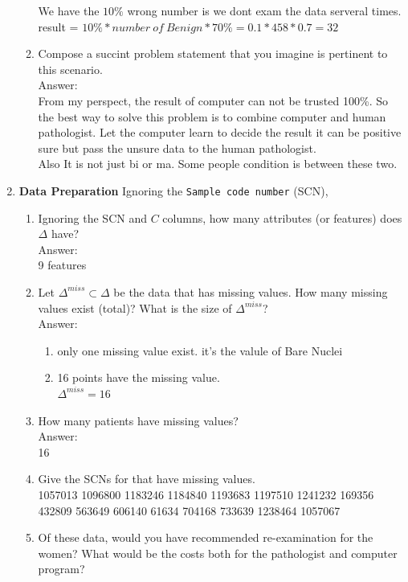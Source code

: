 \documentclass{article}
\begin{document}
\begin{enumerate}
\begin{enumerate}
 	 We have the $10\%$ wrong number is we dont exam the data serveral times.\\
 	 result = $10\% * number\ of\ Benign * 70\% = 0.1*458*0.7 =  32$
 	 \item Compose a succint problem statement that you imagine is pertinent to this scenario. \\
 	 Answer:\\
 	 From my perspect, the result of computer can not be trusted 100\%. So the best way to solve this problem is to combine computer and human pathologist. Let the computer learn to decide the result it can be positive sure but pass the unsure data to the human pathologist.\\
 	 Also It is not just bi or ma. Some people condition is between these two.
 	 \end{enumerate} \item {\bf Data Preparation} Ignoring the \texttt{Sample code number} (SCN), \begin{enumerate} \item Ignoring the SCN and $C$ columns, how many attributes (or features) does $\Delta$ have? \\
 	 Answer:\\
 	 9 features
 	 \item Let $\Delta^{miss}\subset \Delta$ be the data that has missing values.  How many missing values exist (total)?  What is the size of $\Delta^{miss}$? \\
 	 Answer:\\
 	 \begin{enumerate}
 	 	\item only one missing value exist. it's the valule of Bare Nuclei
 	 	\item 16 points have the missing value. \\
 	 	$\Delta^{miss} = 16$
 	 \end{enumerate}
 	 \item How many patients have missing values?\\
 	 Answer:\\
 	 16
 	  \item Give the SCNs for that have missing values.  \\
 	  1057013 1096800 1183246 1184840 1193683 1197510 1241232  169356  432809  563649  606140   61634  704168  733639 1238464 1057067
 	  \item Of these data, would you have recommended re-examination for the women?  What would be the costs both for the pathologist and computer program? \\

\end{enumerate}
\end{enumerate}
\end{document}
